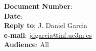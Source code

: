 \documentclass[10pt,a4paper,oneside,final,notitlepage]{article}%
\begin{document}


\noindent
\textbf{Document Number}: \texttt{\paperid}\\
\textbf{Date}: \paperdate\\
\textbf{Reply to}: J. Daniel Garcia\\ 
\textbf{e-mail}: \url{jdgarcia@inf.uc3m.es}\\
\textbf{Audience}: All\\

\title{\papertitle}
\date{}

\begingroup
\let\newpage\relax%
\maketitle
\endgroup





\end{document}
